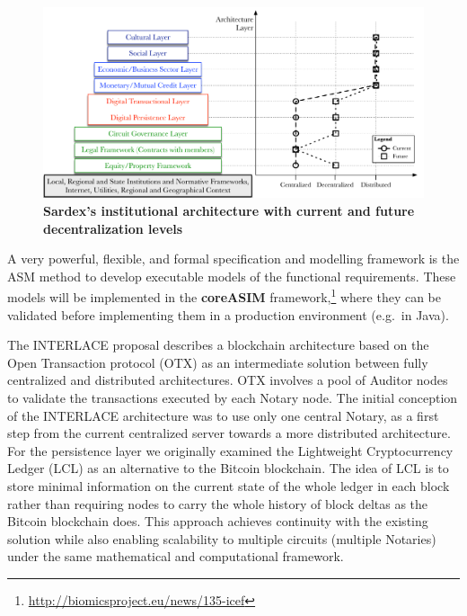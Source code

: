 \begin{figure}[htbp]
\centering
\includegraphics[width=16cm]{Figures/Sardex_Institutional_Structure_V3}
\caption{\small\textbf{Sardex's institutional architecture with current and future decentralization levels}}
\label{decentralizedarchitecture}
\end{figure}

A very powerful, flexible, and formal specification and modelling framework is the ASM method  \cite{BoergerStaerk2003} to develop executable models of the functional requirements. These models will be implemented in the \textbf{coreASIM} framework,\footnote{\url{http://biomicsproject.eu/news/135-icef}} where they can be validated before implementing them in a production environment (e.g.\ in Java).

The INTERLACE proposal describes a blockchain architecture based on the Open Transaction protocol (OTX) \cite{Odom} as an intermediate solution between fully centralized and distributed architectures. OTX involves a pool of Auditor nodes to validate the transactions executed by each Notary node. The initial conception of the INTERLACE architecture was to use only one central Notary, as a first step from the current centralized server towards a more distributed architecture. For the persistence layer we originally examined the Lightweight Cryptocurrency Ledger (LCL) \cite{White2015} as an alternative to the Bitcoin blockchain. The idea of LCL is to store minimal information on the current state of the whole ledger in each block rather than requiring nodes to carry the whole history of block deltas as the Bitcoin blockchain does. This approach achieves continuity with the existing solution while also enabling scalability to multiple circuits (multiple Notaries) under the same mathematical and computational framework.

